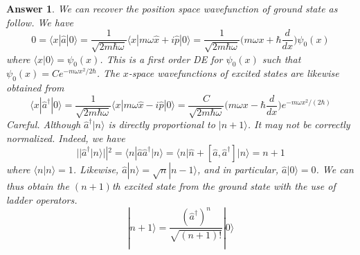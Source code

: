 \documentclass[a4paper]{article}
\newtheorem{ans}{Answer}[subsection]
\theoremstyle{new}
\begin{document}
\begin{ans}
We can recover the position space wavefunction of ground state as follow. We have 
$$0=\langle x|\hat{a}|0\rangle=\frac{1}{\sqrt{2m\hbar\omega}}\langle x|m\omega\hat{x}+i\hat{p}|0\rangle=\frac{1}{\sqrt{2m\hbar\omega}}\bigg(m\omega x+\hbar\frac{d}{dx}\bigg)\psi_0(x)$$
where $\langle x|0\rangle=\psi_0(x)$. This is a first order DE for $\psi_0(x)$ such that $\psi_0(x)=Ce^{-m\omega x^2/2\hbar}$. The $x$-space wavefunctions of excited states are likewise obtained from
$$\langle x|\hat{a}^\dag|0\rangle=\frac{1}{\sqrt{2m\hbar\omega}}\langle x|m\omega\hat{x}-i\hat{p}|0\rangle=\frac{C}{\sqrt{2m\hbar\omega}}\bigg(m\omega x-\hbar\frac{d}{dx}\bigg)e^{-m\omega x^2/(2\hbar)}$$
Careful. Although $\hat{a}^\dag|n\rangle$ is directly proportional to $|n+1\rangle$. It may not be correctly normalized. Indeed, we have
$$||\hat{a}^\dag|n\rangle||^2=\langle n|\hat{a}\hat{a}^\dag|n\rangle=\langle n|\hat{n}+[\hat{a},\hat{a}^\dag]|n\rangle=n+1$$
where $\langle n|n\rangle=1$. Likewise, $\hat{a}|n\rangle=\sqrt{n}|n-1\rangle$, and in particular, $\hat{a}|0\rangle=0$. We can thus obtain the $(n+1)$th excited state from the ground state with the use of ladder operators.
$$|n+1\rangle=\frac{(\hat{a}^\dag)^n}{\sqrt{(n+1)!}}|0\rangle$$
\end{ans}
\newpage
\end{document}
